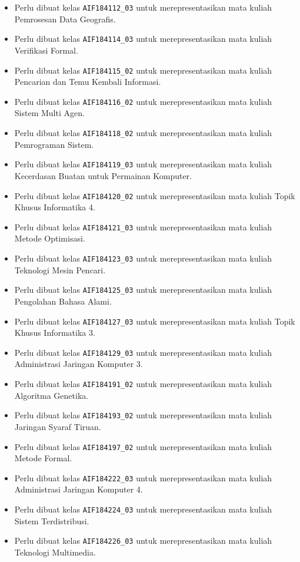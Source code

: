 \begin{enumerate}
\begin{itemize}
		\item Perlu dibuat kelas \texttt{AIF184112\_03} untuk merepresentasikan mata kuliah Pemrosesan Data Geografis.
		\item Perlu dibuat kelas \texttt{AIF184114\_03} untuk merepresentasikan mata kuliah Verifikasi Formal.
		\item Perlu dibuat kelas \texttt{AIF184115\_02} untuk merepresentasikan mata kuliah Pencarian dan Temu Kembali Informasi.
		\item Perlu dibuat kelas \texttt{AIF184116\_02} untuk merepresentasikan mata kuliah Sistem Multi Agen.
		\item Perlu dibuat kelas \texttt{AIF184118\_02} untuk merepresentasikan mata kuliah Pemrograman Sistem.
		\item Perlu dibuat kelas \texttt{AIF184119\_03} untuk merepresentasikan mata kuliah Kecerdasan Buatan untuk Permainan Komputer.
		\item Perlu dibuat kelas \texttt{AIF184120\_02} untuk merepresentasikan mata kuliah Topik Khusus Informatika 4.
		\item Perlu dibuat kelas \texttt{AIF184121\_03} untuk merepresentasikan mata kuliah Metode Optimisasi.
		\item Perlu dibuat kelas \texttt{AIF184123\_03} untuk merepresentasikan mata kuliah Teknologi Mesin Pencari.
		\item Perlu dibuat kelas \texttt{AIF184125\_03} untuk merepresentasikan mata kuliah Pengolahan Bahasa Alami.
		\item Perlu dibuat kelas \texttt{AIF184127\_03} untuk merepresentasikan mata kuliah Topik Khusus Informatika 3.
		\item Perlu dibuat kelas \texttt{AIF184129\_03} untuk merepresentasikan mata kuliah Administrasi Jaringan Komputer 3.
		\item Perlu dibuat kelas \texttt{AIF184191\_02} untuk merepresentasikan mata kuliah Algoritma Genetika.
		\item Perlu dibuat kelas \texttt{AIF184193\_02} untuk merepresentasikan mata kuliah Jaringan Syaraf Tiruan.
		\item Perlu dibuat kelas \texttt{AIF184197\_02} untuk merepresentasikan mata kuliah Metode Formal.
		\item Perlu dibuat kelas \texttt{AIF184222\_03} untuk merepresentasikan mata kuliah Administrasi Jaringan Komputer 4.
		\item Perlu dibuat kelas \texttt{AIF184224\_03} untuk merepresentasikan mata kuliah Sistem Terdistribusi.
		\item Perlu dibuat kelas \texttt{AIF184226\_03} untuk merepresentasikan mata kuliah Teknologi Multimedia.

\end{itemize}
\end{enumerate}
